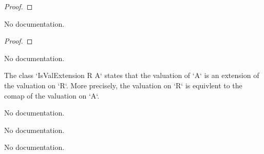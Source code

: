 \begin{proof}
    \leanok
\end{proof}

\begin{theorem}\label{IsValExtension.val_map_lt_one_iff}
        \leanok
                No documentation.
    \end{theorem}

\begin{proof}
    \leanok
\end{proof}

\begin{theorem}\label{IsValExtension.val_map_eq_one_iff}
                No documentation.
    \end{theorem}

\begin{definition}\label{IsValExtension}
        \leanok
                The class `IsValExtension R A` states that the valuation of `A` is an extension of the valuation
on `R`. More precisely, the valuation on `R` is equivlent to the comap of the valuation on `A`.
    \end{definition}

\begin{definition}\label{IsValExtension.ofIntegerComap}
        \leanok
                No documentation.
    \end{definition}

\begin{definition}\label{IsValExtension.ofValuationSubringComap}
                No documentation.
    \end{definition}

\begin{theorem}\label{IsValExtension.coe_algebraMap_integer}
        \leanok
                No documentation.
    \end{theorem}

